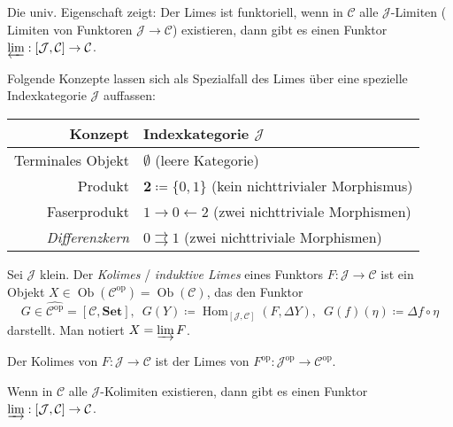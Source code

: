 \documentclass{cheat-sheet}
\newcommand{\SetC}{\mathbf{Set}} %
\newcommand{\op}{\mathrm{op}} %
\DeclareMathOperator{\Hom}{Hom} %
\newcommand{\Cat}{\mathcal{C}} %
\newcommand{\Jat}{\mathcal{J}} %
\DeclareMathOperator{\Ob}{Ob} %
\begin{document}
\begin{bem}
  Die univ. Eigenschaft zeigt: Der Limes ist funktoriell, \dh{} wenn in $\Cat$ alle $\Jat$-Limiten (\dh{} Limiten von Funktoren $\Jat \to \Cat$) existieren, dann gibt es einen Funktor $\varprojlim : [\Jat, \Cat] \to \Cat$.
\end{bem}

\begin{bem}
  Folgende Konzepte lassen sich als Spezialfall des Limes über eine spezielle Indexkategorie $\Jat$ auffassen:
  \begin{center}
    \begin{tabular}{ | r | l | }
      \hline
      Konzept & Indexkategorie $\Jat$ \\ \hline
      Terminales Objekt & $\emptyset$ (leere Kategorie) \\
      Produkt & $\mathbf{2} \coloneqq \{ 0, 1 \}$ (kein nichttrivialer Morphismus) \\
      Faserprodukt & $1 \to 0 \leftarrow 2$ (zwei nichttriviale Morphismen) \\
      \emph{Differenzkern} &  $0 \rightrightarrows 1$ (zwei nichttriviale Morphismen) \\ \hline
    \end{tabular}
  \end{center}
\end{bem}


\begin{defn}
  Sei $\Jat$ klein.
  Der \emph{Kolimes} / \emph{induktive Limes} eines Funktors $F : \Jat \to \Cat$ ist ein Objekt $X \in \Ob(\Cat^\op) = \Ob(\Cat)$, das den Funktor
  \[
    G \in \hat{\Cat^\op} = [\Cat, \SetC], \enspace
    G(Y) \coloneqq \Hom_{[\Jat, \Cat]}(F, \Delta Y), \enspace
    G(f)(\eta) \coloneqq \Delta f \circ \eta
  \]
  darstellt. Man notiert $X = \varinjlim F$.
\end{defn}

\begin{bem}
  Der Kolimes von $F \!:\! \Jat \!\to\! \Cat$ ist der Limes von $F^\op \!:\! \Jat^\op \!\to\! \Cat^\op$.
\end{bem}

\begin{bem}
  Wenn in $\Cat$ alle $\Jat$-Kolimiten existieren, dann gibt es einen Funktor $\varinjlim : [\Jat, \Cat] \to \Cat$.
\end{bem}
\end{document}
